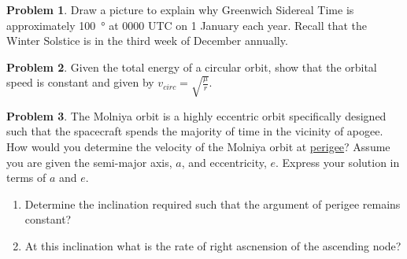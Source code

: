 \documentclass[10pt]{article}
\theoremstyle{definition}
\newtheorem{prob}{Problem}[section]
\newenvironment{subprob}%
{\renewcommand{\theenumi}{\alph{enumi}}\renewcommand{\labelenumi}{(\theenumi)}\begin{enumerate}}%
{\end{enumerate}}%
\begin{document}
\clearpage\newpage
\null\newpage
\null\newpage

\begin{prob}
    Draw a picture to explain why Greenwich Sidereal Time is approximately \SI{100}{\degree} at \num{0000} UTC on 1 January each year.
    Recall that the Winter Solstice is in the third week of December annually.
\end{prob}

\begin{prob}
    Given the total energy of a circular orbit, show that the orbital speed is constant and given by \( v_{circ} = \sqrt{\frac{\mu}{r}}\).
\end{prob}

\begin{prob}
    The Molniya orbit is a highly eccentric orbit specifically designed such that the spacecraft spends the majority of time in the vicinity of apogee.
    How would you determine the velocity of the Molniya orbit  at \underline{perigee}?
    Assume you are given the semi-major axis, \( a \), and eccentricity, \( e\).
    Express your solution in terms of \( a \) and \( e\).

    \begin{subprob}
        \item Determine the inclination required such that the argument of perigee remains constant?
        \item At this inclination what is the rate of right ascnension of the ascending node?
    \end{subprob}
\end{prob}
\end{document}
